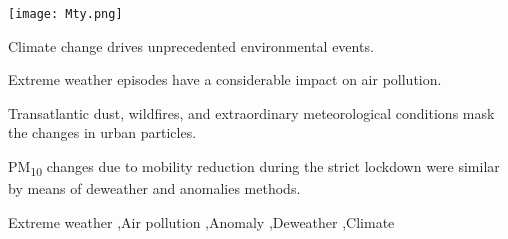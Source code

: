\documentclass[preprint,12pt]{elsarticle}
\begin{document}
\begin{frontmatter}
\begin{abstract}
	\end{abstract}
	\begin{graphicalabstract}
		\texttt{[image: Mty.png]}
	\end{graphicalabstract}
	\begin{highlights}
		\item Climate change drives unprecedented environmental events. 
		\item Extreme weather episodes have a considerable impact on air pollution.
		\item Transatlantic dust, wildfires, and extraordinary meteorological conditions mask the changes in urban particles.
		\item PM\textsubscript{10} changes due to mobility reduction during the strict lockdown were similar by means of deweather and anomalies methods.
	\end{highlights}
	\begin{keyword}
	Extreme weather \sep Air pollution \sep Anomaly \sep Deweather \sep Climate
	\end{keyword}
\end{frontmatter}
\end{document}
